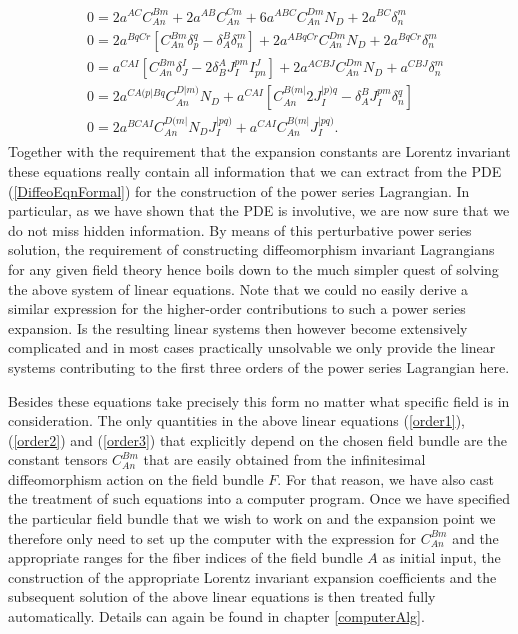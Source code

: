 \documentclass[a4paper,12pt, DIV=14, BCOR=5mm, twoside, headsepline, numbers=noenddot]{scrbook}
\begin{document}
\begin{align}\label{order3}
\begin{aligned}
&0 = 2 a^{AC}C_{An}^{Bm} + 2a^{AB}C_{An}^{Cm} + 6 a^{ABC}C_{An}^{Dm} N_D + 2a^{BC} \delta^m_n\\
&0 = 2 a^{BqCr} \left [ C_{An}^{Bm} \delta ^q_p - \delta^B_A \delta^m_n \right ] +2 a^{A Bq Cr} C_{An}^{Dm} N_D + 2 a^{BqCr} \delta^m_n\\
&0 = a^{CAI} \left [C_{An}^{Bm}\delta^I _J- 2 \delta^A_B J_I^{pm}I^J_{pn} \right ] + 2 a^{ACBJ} C_{An}^{Dm} N_D + a^{CBJ} \delta ^m _n \\
&0 = 2 a^{C A(p \vert B q} C_{An}^{D \vert m )} N_D + a^{CAI} \left [C_{An}^{B(m\vert} 2 J_{I}^{\vert p)q} - \delta_A^BJ_I^{pm}\delta^q_n \right ]\\
&0 = 2 a^{BCAI}C_{An}^{D(m\vert}N_DJ_I^{\vert pq)} + a^{CAI}C_{An}^{B(m \vert} J_I^{\vert pq)}.
\end{aligned}
\end{align}
Together with the requirement that the expansion constants are Lorentz invariant these equations really contain all information that we can extract from the PDE (\ref{DiffeoEqnFormal}) for the construction of the power series Lagrangian. In particular, as we have shown that the PDE is involutive, we are now sure that we do not miss hidden information.  By means of this perturbative power series solution, the requirement of constructing diffeomorphism invariant Lagrangians for any given field theory hence boils down to the much simpler quest of solving the above system of linear equations.
Note that we could no easily derive a similar expression for the higher-order contributions to such a power series expansion. Is the resulting linear systems then however become extensively complicated and in most cases practically unsolvable we only provide the linear systems contributing to the first three orders of the power series Lagrangian here. 

Besides these equations take precisely this form no matter what specific field is in consideration. The only quantities in the above linear equations (\ref{order1}), (\ref{order2}) and (\ref{order3}) that explicitly depend on the chosen field bundle are the constant tensors $C_{An}^{Bm}$ that are easily obtained from the infinitesimal diffeomorphism action on the field bundle $F$.  For that reason, we have also cast the treatment of such equations into a computer program. Once we have specified the particular field bundle that we wish to work on and the expansion point we therefore only need to set up the computer with the expression for $C_{An}^{Bm}$ and the appropriate ranges for the fiber indices of the field bundle $A$ as initial input, the construction of the appropriate Lorentz invariant expansion coefficients and the subsequent solution of the above linear equations is then treated fully automatically. Details can again be found in chapter \ref{computerAlg}. 
\end{document}
